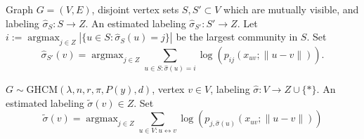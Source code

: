 \documentclass{article}
\DeclareMathOperator*{\argmax}{argmax}
\newcommand{\1}{\mathbbm{1}}
\newcommand{\visible}{\leftrightarrow{}}
\theoremstyle{definition}
\theoremstyle{plain}
\begin{document}
\begin{algorithm}
\caption{\texttt{Propagate}}
\label{alg:propagate}
\begin{algorithmic}[1]
\Require Graph $G = (V, E)$, disjoint vertex sets $S, S' \subset V$ which are mutually visible, and labeling $\hat{\sigma}_S : S \to Z$.
\Ensure An estimated labeling $\hat{\sigma}_{S'}: S' \to Z$.
\State Let $i := \argmax_{j \in Z} |\{u \in S: \hat{\sigma}_S(u) = j\}|$ be the largest community in $S$.
    \State Set 
\begin{equation*}
    \hat{\sigma}_{S'}(v) = \argmax_{j \in Z} \sum_{u \in S: \hat{\sigma}(u) = i} \log(p_{ij}(x_{uv}; \|u - v\|)).
\end{equation*}
\EndFor
\end{algorithmic}
\end{algorithm}


\begin{algorithm}
\caption{\texttt{Refine}}
\label{alg:Refine}
\begin{algorithmic}[1]
\Require $G \sim \text{GHCM}(\lambda, n, r, \pi, P(y), d)$, vertex $v \in V$, labeling $\hat{\sigma}:V \to Z \cup \{*\}$.
\Ensure An estimated labeling $\tilde{\sigma}(v) \in Z$.
\State Set 
\begin{equation*}
    \tilde{\sigma}(v) = \argmax_{j \in Z} \sum_{u \in V: u \visible v} \log( p_{j, \hat{\sigma}(u)}(x_{uv}; \|u - v\|) )
\end{equation*}
\end{algorithmic}
\end{algorithm}
\FloatBarrier
\end{document}
